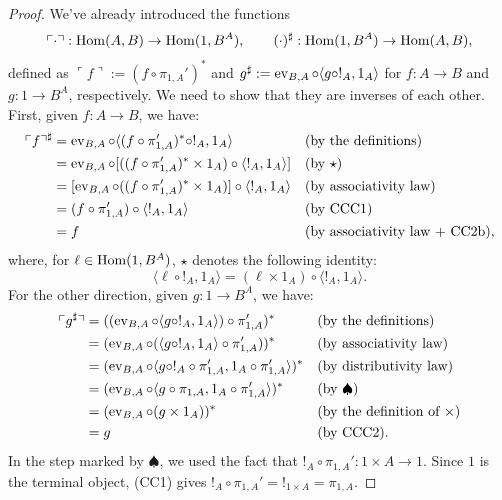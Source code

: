 \begin{proof}
    We've already introduced the functions
    \[ \ulcorner \cdot \urcorner : \operatorname{Hom}(A,B) \to \operatorname{Hom}(1, B^A), \qquad (\cdot)^\sharp : \operatorname{Hom}(1, B^A) \to \operatorname{Hom}(A,B),\]
    defined as $\ulcorner f \urcorner := (f \circ \pi_{1,A}')^*$ and $g^\sharp := \operatorname{ev}_{B,A} \circ \langle g \circ !_A,1_A\rangle$ for $f : A \to B$ and $g : 1 \to B^A$, respectively.
    We need to show that they are inverses of each other. First, given $f : A \to B$, we have:
    \begin{align*}
        \ulcorner f \urcorner^\sharp &= \operatorname{ev}_{B,A} \circ \langle (f \circ \pi_{1,A}')^* \circ !_A, 1_A\rangle &&(\textnormal{by the definitions}) \\
                                     &= \operatorname{ev}_{B,A} \circ [((f \circ \pi_{1,A}')^* \times 1_A) \circ \langle !_A, 1_A\rangle] &&(\textnormal{by $\star$}) \\
                                     &= [\operatorname{ev}_{B,A} \circ ((f \circ \pi_{1,A}')^*\times 1_A)] \circ \langle !_A, 1_A\rangle &&(\textnormal{by associativity law}) \\
                                     &= (f \circ \pi_{1,A}') \circ \langle !_A, 1_A\rangle &&(\textnormal{by CCC1}) \\
                                     &= f &&(\textnormal{by associativity law + CC2b}),
    \end{align*}
    where, for $\ell \in \operatorname{Hom}(1,B^A)$, $\star$ denotes the following identity:
    \[ \langle \ell \circ !_A, 1_A\rangle = (\ell \times 1_A) \circ \langle !_A, 1_A\rangle. \]
    For the other direction, given $g : 1 \to B^A$, we have:
    \begin{align*}
        \ulcorner g^\sharp \urcorner &= ((\operatorname{ev}_{B,A} \circ \langle g \circ !_A,1_A\rangle) \circ \pi_{1,A}')^* &&(\textnormal{by the definitions}) \\
                                     &= (\operatorname{ev}_{B,A} \circ (\langle g \circ !_A, 1_A\rangle \circ \pi_{1,A}'))^* &&(\textnormal{by associativity law}) \\
                                     &= (\operatorname{ev}_{B,A} \circ \langle g \circ !_A \circ \pi_{1,A}', 1_A \circ \pi_{1,A}'\rangle)^* &&(\textnormal{by distributivity law}) \\
                                     &= (\operatorname{ev}_{B,A} \circ \langle g \circ \pi_{1,A}, 1_A \circ \pi_{1,A}'\rangle)^* &&(\textnormal{by $\spadesuit$}) \\
                                     &= (\operatorname{ev}_{B,A} \circ (g \times 1_A))^* &&(\textnormal{by the definition of $\times$}) \\
                                     &= g &&(\textnormal{by CCC2}).
    \end{align*}
    In the step marked by $\spadesuit$, we used the fact that $!_A \circ \pi_{1,A}' : 1 \times A \to 1$. Since $1$ is the terminal object, (CC1) gives $!_A \circ \pi_{1,A}' = !_{1 \times A} = \pi_{1,A}$.
\end{proof}


